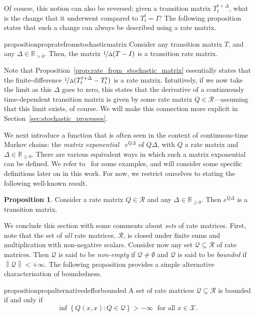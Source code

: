 \documentclass[10pt,a4paper]{paper}
\theoremstyle{definition}
\newtheorem{proposition}[theorem]{Proposition}
\newcommand{\reals}{\mathbb{R}}
\newcommand{\realspos}{\reals_{>0}}
\newcommand{\realsnonneg}{\reals_{\geq 0}}
\newcommand{\states}{\mathcal{X}}
\newcommand{\rateset}{\mathcal{Q}}
\newcommand{\norm}[1]{\left\lVert #1 \right\rVert}
\begin{document}
Of course, this notion can also be reversed; given a transition matrix $T_t^{t+\Delta}$, what is the change that it underwent compared to $T_t^t=I$? The following proposition states that such a change can always be described using a rate matrix.
\begin{restatable}{proposition}{propratefromstochasticmatrix}
\label{prop:rate_from_stochastic_matrix}
Consider any transition matrix $T$, and any $\Delta\in\realspos$. Then, the matrix $\nicefrac{1}{\Delta}(T-I)$ is a transition rate matrix.
\end{restatable}
Note that Proposition~\ref{prop:rate_from_stochastic_matrix} essentially states that the finite-difference $\nicefrac{1}{\Delta}(T_t^{t+\Delta} - T_t^t)$ is a rate matrix. Intuitively, if we now take the limit as this $\Delta$ goes to zero, this states that the derivative of a continuously time-dependent transition matrix is given by some rate matrix $Q\in\mathcal{R}$---assuming that this limit exists, of course. We will make this connection more explicit in Section~\ref{sec:stochastic_processes}.

We next introduce a function that is often seen in the context of continuous-time Markov chains: the \emph{matrix exponential}~\cite{van2006study} $e^{Q\Delta}$ of $Q \Delta$, with $Q$ a rate matrix and $\Delta\in\reals_{\geq0}$. 
There are various equivalent ways in which such a matrix exponential can be defined. We refer to~\cite{van2006study} for some examples, and will consider some specific definitions later on in this work.
For now, we restrict ourselves to stating the following well-known result.
\begin{proposition}\cite[Theorem 2.1.2]{norris1998markov}\label{prop:stochastic_from_exponential}
Consider a rate matrix $Q\in\mathcal{R}$ and any $\Delta\in\realsnonneg$. Then $e^{Q\Delta}$ is a transition matrix.
\end{proposition}

We conclude this section with some comments about \emph{sets} of rate matrices. First, note that the set of \emph{all} rate matrices, $\mathcal{R}$, is closed under finite sums and multiplication with non-negative scalars. Consider now any set $\rateset\subseteq\mathcal{R}$ of rate matrices. Then $\rateset$ is said to be \emph{non-empty} if $\rateset\neq\emptyset$ and $\rateset$ is said to be \emph{bounded} if $\norm{\rateset}<+\infty$. The following proposition provides a simple alternative characterisation of boundedness. \label{notation:rate_set}

\begin{restatable}{proposition}{propalternativedefforbounded}
\label{prop:alternativedefforbounded}
A set of rate matrices $\rateset\subseteq\mathcal{R}$ is bounded if and only if
\begin{equation}\label{eq:alternative_bounded}
\inf\left\{Q(x,x)\colon Q\in\rateset\right\}>-\infty\text{~~for all $x\in\states$.}
\end{equation}
\end{restatable}
\end{document}
